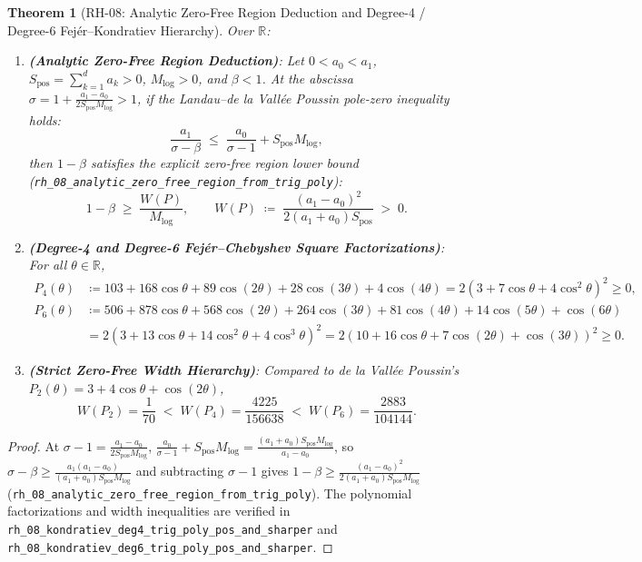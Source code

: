 \documentclass[11pt,a4paper]{article}
\theoremstyle{plain}
\newtheorem{theorem}{Theorem}[section]
\theoremstyle{definition}
\theoremstyle{remark}
\newcommand{\R}{\mathbb{R}}
\begin{document}
\begin{theorem}[$\mathrm{RH\text{-}08}$: Analytic Zero-Free Region Deduction and Degree-4 / Degree-6 Fej\'er--Kondratiev Hierarchy]\label{thm:rh08}
Over $\R$:
\begin{enumerate}
  \item \textbf{(Analytic Zero-Free Region Deduction)}: Let $0 < a_0 < a_1$, $S_{\mathrm{pos}} = \sum_{k=1}^{d} a_k > 0$, $M_{\log} > 0$, and $\beta < 1$. At the abscissa $\sigma = 1 + \frac{a_1 - a_0}{2 S_{\mathrm{pos}} M_{\log}} > 1$, if the Landau--de la Vall\'ee Poussin pole-zero inequality holds:
  \begin{equation}
    \frac{a_1}{\sigma - \beta} \;\le\; \frac{a_0}{\sigma - 1} + S_{\mathrm{pos}} M_{\log},
  \end{equation}
  then $1 - \beta$ satisfies the explicit zero-free region lower bound (\texttt{rh\_08\_analytic\_zero\_free\_region\_from\_trig\_poly}):
  \begin{equation}
    1 - \beta \;\ge\; \frac{W(P)}{M_{\log}}, \qquad W(P) \;\coloneqq\; \frac{(a_1 - a_0)^2}{2(a_1 + a_0) S_{\mathrm{pos}}} \;>\; 0.
  \end{equation}
  \item \textbf{(Degree-4 and Degree-6 Fej\'er--Chebyshev Square Factorizations)}: For all $\theta \in \R$,
  \begin{align}
    P_4(\theta) &\coloneqq 103 + 168\cos\theta + 89\cos(2\theta) + 28\cos(3\theta) + 4\cos(4\theta) = 2(3 + 7\cos\theta + 4\cos^2\theta)^2 \ge 0, \\
    P_6(\theta) &\coloneqq 506 + 878\cos\theta + 568\cos(2\theta) + 264\cos(3\theta) + 81\cos(4\theta) + 14\cos(5\theta) + \cos(6\theta) \nonumber\\
                &= 2(3 + 13\cos\theta + 14\cos^2\theta + 4\cos^3\theta)^2 = 2(10 + 16\cos\theta + 7\cos(2\theta) + \cos(3\theta))^2 \ge 0.
  \end{align}
  \item \textbf{(Strict Zero-Free Width Hierarchy)}: Compared to de la Vall\'ee Poussin's $P_2(\theta) = 3 + 4\cos\theta + \cos(2\theta)$,
  \begin{equation}
    W(P_2) = \frac{1}{70} \;<\; W(P_4) = \frac{4225}{156638} \;<\; W(P_6) = \frac{2883}{104144}.
  \end{equation}
\end{enumerate}
\end{theorem}

\begin{proof}
At $\sigma - 1 = \frac{a_1 - a_0}{2 S_{\mathrm{pos}} M_{\log}}$, $\frac{a_0}{\sigma - 1} + S_{\mathrm{pos}} M_{\log} = \frac{(a_1 + a_0) S_{\mathrm{pos}} M_{\log}}{a_1 - a_0}$, so $\sigma - \beta \ge \frac{a_1(a_1 - a_0)}{(a_1 + a_0) S_{\mathrm{pos}} M_{\log}}$ and subtracting $\sigma - 1$ gives $1 - \beta \ge \frac{(a_1 - a_0)^2}{2(a_1 + a_0) S_{\mathrm{pos}} M_{\log}}$ (\texttt{rh\_08\_analytic\_zero\_free\_region\_from\_trig\_poly}). The polynomial factorizations and width inequalities are verified in \texttt{rh\_08\_kondratiev\_deg4\_trig\_poly\_pos\_and\_sharper} and \texttt{rh\_08\_kondratiev\_deg6\_trig\_poly\_pos\_and\_sharper}.
\end{proof}
\end{document}
